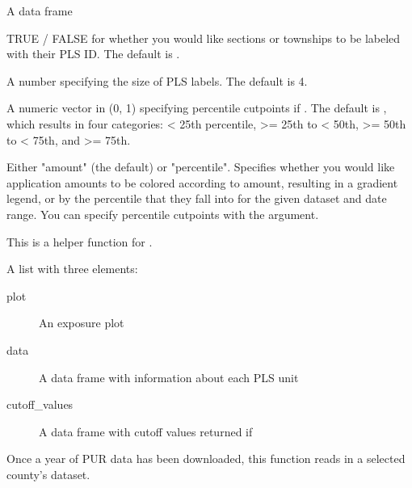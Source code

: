 \documentclass[a4paper]{book}
\begin{document}
\begin{Arguments}
\begin{ldescription}
\item[\code{clean\_pur}] A  data frame

\item[\code{pls\_labels}] TRUE / FALSE for whether you would like sections or townships
to be labeled with their PLS ID. The default is .

\item[\code{pls\_labels\_size}] A number specifying the size of PLS labels. The default
is 4.

\item[\code{percentile}] A numeric vector in (0, 1) specifying percentile cutpoints
if . The default is ,
which results in four categories: < 25th percentile, >= 25th to < 50th,
>= 50th to < 75th, and >= 75th.

\item[\code{color\_by}] Either "amount" (the default) or "percentile". Specifies
whether you would like application amounts to be colored according to
amount, resulting in a gradient legend, or by the percentile that they fall
into for the given dataset and date range. You can specify percentile
cutpoints with the  argument.
\end{ldescription}
\end{Arguments}
%
\begin{Details}\relax
This is a helper function for .
\end{Details}
%
\begin{Value}
A list with three elements:
\begin{description}

\item[plot] An exposure plot
\item[data] A data frame with information about each PLS unit
\item[cutoff\_values] A data frame with cutoff values returned if

\end{description}

\end{Value}
%
\begin{Description}\relax
Once a year of PUR data has been downloaded, this function reads in a
selected county's dataset.
\end{Description}
\end{document}
